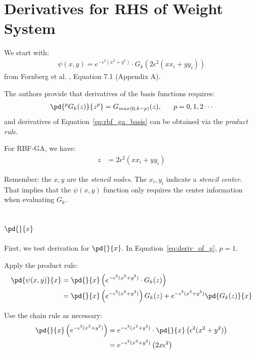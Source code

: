 \documentclass[11pt]{report}
\begin{document}
\tableofcontents
\fi

{ \graphicspath{{rbffd_methods_content/}}

\chapter{Derivatives for RHS of Weight System}
We start with:
\begin{align} 
\psi (x,y) = e^{-\epsilon^2(x^2+y^2)} \cdot G_k(2\epsilon^2(x x_i +y y_i)) \label{eq:rbf_ga_basis}
\end{align}
from Fornberg et al. \cite{Fornberg2012}, Equation 7.1 (Appendix A).


The authors provide that derivatives of the basis functions requires:
\begin{align}
\pd{^p G_k(z)}{z^p} = G_{max(0,k-p)} (z), \ \ \ \ \ p = 0, 1, 2 \cdots 
\label{eq:deriv_of_g}
\end{align}
and derivatives of Equation~\ref{eq:rbf_ga_basis} can be obtained via the \emph{product rule}. 

For RBF-GA, we have: 
\begin{align}
z & = 2\epsilon^2(x x_i + y y_i) \label{eq:gamma_z}
\end{align}

Remember: the $x, y$ are the \emph{stencil nodes}. The $x_i, y_i$ indicate a \emph{stencil center}. That implies that the $\psi(x,y)$ function only requires the center information when evaluating $G_k$.

\section{$\pd{}{x}$}

First, we test derivation for $\pd{}{x}$. In Equation~\ref{eq:deriv_of_g}, $p=1$.

Apply the product rule: 
\begin{align}
\pd{\psi(x,y)}{x} & = \pd{}{x} \left( e^{-\epsilon^2(x^2+y^2)} \cdot G_k(z)  \right) \nonumber \\
& = \pd{}{x}\left( e^{-\epsilon^2 (x^2 + y^2)} \right) G_k(z) + e^{-\epsilon^2(x^2 + y^2)} \pd{G_k(z)}{x} \label{eq:x_product_rule}
\end{align}

Use the chain rule as necessary:
\begin{align}
\pd{}{x}\left( e^{-\epsilon^2 (x^2 + y^2)} \right) & = e^{-\epsilon^2 (x^2 + y^2)} \cdot \pd{}{x} \left( \epsilon^2(x^2+y^2) \right) \nonumber \\
        & = e^{-\epsilon^2 (x^2 + y^2)} \left(2x \epsilon^2 \right) \label{eq:x_part1}
\end{align}

}
\end{document}

